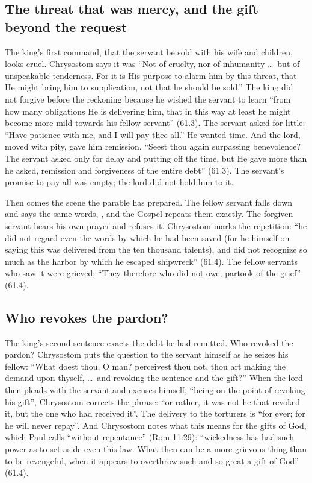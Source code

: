 \subsection{The threat that was mercy, and the gift beyond the request}

The king's first command, that the servant be sold with his wife and children,
looks cruel. Chrysostom says it was ``Not of cruelty, nor of inhumanity \dots\ but
of unspeakable tenderness. For it is His purpose to alarm him by this threat,
that He might bring him to supplication, not that he should be sold.'' The king
did not forgive before the reckoning because he wished the servant to learn
``from how many obligations He is delivering him, that in this way at least he
might become more mild towards his fellow servant'' (61.3). The servant asked
for little: ``Have patience with me, and I will pay thee all.'' He wanted time. And
the lord, moved with pity, gave him remission. ``Seest thou again surpassing
benevolence? The servant asked only for delay and putting off the time, but He
gave more than he asked, remission and forgiveness of the entire debt'' (61.3).
The servant's promise to pay all was empty; the lord did not hold him to it.

Then comes the scene the parable has prepared. The fellow servant falls down and
says the same words, , and the
Gospel repeats them exactly. The forgiven servant hears his own prayer and
refuses it. Chrysostom marks the repetition: ``he did not regard even the words by
which he had been saved (for he himself on saying this was delivered from the ten
thousand talents), and did not recognize so much as the harbor by which he
escaped shipwreck'' (61.4). The fellow servants who saw it were grieved; ``They
therefore who did not owe, partook of the grief'' (61.4).

\subsection{Who revokes the pardon?}

The king's second sentence exacts the debt he had remitted. Who revoked the
pardon? Chrysostom puts the question to the servant himself as he seizes his
fellow: ``What doest thou, O man? perceivest thou not, thou art making the demand
upon thyself, \dots\ and revoking the sentence and the gift?'' When the lord then
pleads with the servant and excuses himself, ``being on the point of revoking his
gift'', Chrysostom corrects the phrase: ``or rather, it was not he that revoked
it, but the one who had received it''. The delivery to the torturers is ``for
ever; for he will never repay''. And Chrysostom notes what this means for the gifts of God,
which Paul calls ``without repentance'' (Rom 11:29): ``wickedness has had such
power as to set aside even this law. What then can be a more grievous thing than
to be revengeful, when it appears to overthrow such and so great a gift of God''
(61.4).

